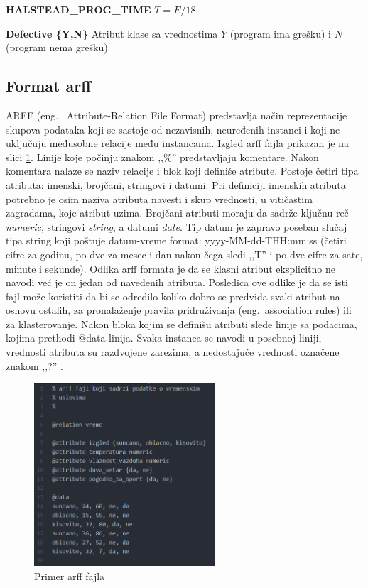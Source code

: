 \documentclass[12pt,oneside]{memoir}
\begin{document}
\textbf{HALSTEAD\_PROG\_TIME} $T = E/18$

\textbf{Defective \{Y,N\} } Atribut klase sa vrednostima $Y$ (program ima grešku) i $N$ (program nema grešku)

\subsection{Format arff}
ARFF (eng.~ Attribute-Relation File Format) predstavlja način reprezentacije skupova podataka koji se sastoje od nezavisnih, neuređenih instanci i koji ne uključuju međusobne relacije među instancama. Izgled arff fajla prikazan je na slici \ref{fig:arff}. Linije koje počinju znakom ,,\%'' predstavljaju komentare. Nakon komentara nalaze se naziv relacije i blok koji definiše atribute. Postoje četiri tipa atributa: imenski, brojčani, stringovi i datumi. Pri definiciji imenskih atributa potrebno je osim naziva atributa navesti i skup vrednosti, u vitičastim zagradama, koje atribut uzima. Brojčani atributi moraju da sadrže ključnu reč \textit{numeric}, stringovi \textit{string}, a datumi \textit{date}. Tip datum je zapravo poseban slučaj tipa string koji poštuje datum-vreme format: yyyy-MM-dd-THH:mm:ss (četiri cifre za godinu, po dve za mesec i dan nakon čega sledi ,,T'' i po dve cifre za sate, minute i sekunde). Odlika arff formata je da se klasni atribut eksplicitno ne navodi već je on jedan od navedenih atributa. Posledica ove odlike je da se isti fajl može koristiti da bi se odredilo koliko dobro se predviđa svaki atribut na osnovu ostalih, za pronalaženje pravila pridruživanja (eng.~association rules) ili za klasterovanje. Nakon bloka kojim se definišu atributi slede linije sa podacima, kojima prethodi @data linija. Svaka instanca se navodi u posebnoj liniji, vrednosti atributa su razdvojene zarezima, a nedostajuće vrednosti označene znakom ,,?'' \cite{weka}. 

\begin{figure}[!ht]
  \centering
  \includegraphics[width=0.60\textwidth]{arff.png}
  \caption{Primer arff fajla}
  \label{fig:arff}
\end{figure}
\end{document}
